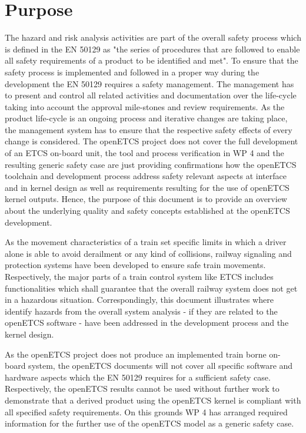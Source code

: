 \documentclass{template/openetcs_report}
\begin{document}
\section{Purpose}
\label{sec:purpose}

The hazard and risk analysis activities are part of the overall safety process which is defined in the EN 50129 as "the series of procedures that are followed to enable all safety requirements of a product to be identified and met". To ensure that the safety process is implemented and followed in a proper way during the development the EN 50129 requires a safety management. The management has to present and control all related activities and documentation over the life-cycle taking into account the approval mile-stones and review requirements. As the product life-cycle is an ongoing process and iterative changes are taking place, the management system has to ensure that the respective safety effects of every change is considered. The openETCS project does not cover the full development of an ETCS on-board unit, the tool and process verification in WP 4 and the resulting generic safety case are just providing confirmations how the openETCS toolchain and development process address safety relevant aspects at interface and in kernel design as well as requirements resulting for the use of openETCS kernel outputs. Hence, the purpose of this document is to provide an overview about the underlying quality and safety concepts established at the openETCS development.

As the movement characteristics of a train set specific limits in which a driver alone is able to avoid derailment or any kind of collisions, railway signaling and protection systems have been developed to ensure safe train movements. Respectively, the major parts of a train control system like ETCS includes functionalities which shall guarantee that the overall railway system does not get in a hazardous situation. Correspondingly, this document illustrates where identify hazards from the overall system analysis - if they are related to the openETCS software -  have been addressed in the development process and the kernel design. 

As the openETCS project does not produce an implemented train borne on-board system, the openETCS documents will not cover all specific software and hardware aspects which the EN 50129 requires for a sufficient safety case. Respectively, the openETCS results cannot be used without further work to demonstrate that a derived product using the openETCS kernel is compliant with all specified safety requirements. On this grounds WP 4 has arranged required information for the further use of the openETCS model as a generic safety case.
\end{document}
